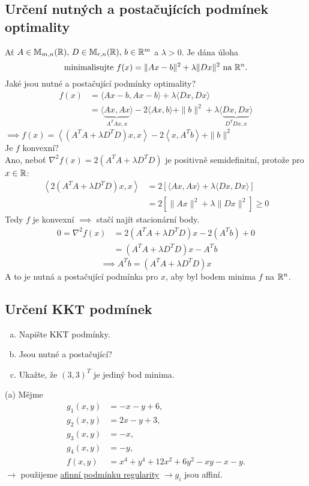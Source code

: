 \subsection{Určení nutných a postačujících podmínek optimality}
Ať $A \in \mathbb{M}_{m,n} (\mathbb{R}), \, D \in \mathbb{M}_{r,n}(\mathbb{R}), \, b\in \mathbb{R}^m$ a $\lambda > 0$. Je dána úloha
\[
    \text{minimalisujte } f(x) = \| Ax - b\|^2 + \lambda \| Dx\|^2  \text{ na } \mathbb{R}^n.
\]
Jaké jsou nutné a postačující podmínky optimality?
\begin{align*}
    f(x) &= \langle Ax - b, Ax - b\rangle + \lambda \langle Dx, Dx\rangle \\
    &= \langle \underbrace{Ax, Ax}_{A^TAx, x}\rangle - 2\langle Ax, b\rangle + \| b\|^2 + \lambda \langle 
        \underbrace{Dx, Dx}_{D^TDx, x}\rangle
\end{align*}
$\implies f(x) = \left\langle \left(A^TA + \lambda D^TD\right)x, x\right\rangle - 2 \left\langle x, A^T b\right\rangle 
+ \| b\|^2$\\
Je $f$ konvexní?\\
Ano, neboť $\nabla^2 f(x) = 2(A^TA + \lambda D^TD)$ je positivně semidefinitní, protože pro $x \in \mathbb{R}$:
\begin{align*}
    \left\langle 2\left(A^TA + \lambda D^TD\right)x, x\right\rangle &= 2 \left[ \langle Ax, Ax\rangle + \lambda 
    \langle Dx, Dx\rangle\right] \\
    &= 2 \left[ \|Ax\|^2 + \lambda \|Dx\|^2\right] \geq 0
\end{align*}
Tedy $f$ je konvexní $\implies$ stačí najít stacionární body.
\begin{align*}
    0 = \nabla^2 f(x) &= 2 (A^TA + \lambda D^TD)x - 2(A^Tb) + 0 \\
    &= (A^TA + \lambda D^TD)x - A^Tb
\end{align*}
\[
    \implies A^Tb = (A^TA + \lambda D^TD)x
\]
A to je nutná a postačující podmínka pro $x$, aby byl bodem minima $f$ na $\mathbb{R}^n$.
    
\subsection{Určení KKT podmínek}
\begin{enumerate}[(a)]
    \item Napište KKT podmínky.
    \item Jsou nutné a postačující?
    \item Ukažte, že $(3, 3)^T$ je jediný bod minima.
\end{enumerate}
(a) Mějme
\begin{align*}
    g_1(x,y) &= -x-y+6, \\
    g_2(x,y) &= 2x-y+3, \\
    g_3(x,y) &= -x, \\
    g_4(x,y) &= -y, \\
    f(x,y) &= x^4 + y^4 + 12 x^2 + 6 y^2 - xy - x - y.
\end{align*}
$\rightarrow$ použijeme \hyperref[afinniPodm]{afinní podmínku regularity} $\rightarrow g_i$ jsou affiní.


